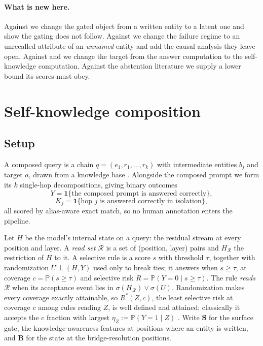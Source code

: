 \documentclass{article}
\newcommand{\gate}{\mathbf{S}}
\newcommand{\bridge}{\mathbf{B}}
\begin{document}
\paragraph{What is new here.} Against \citet{ferrando2025entity} we change the gated object from a
written entity to a latent one and show the gating does not follow. Against
\citet{tamoyan2025factual} we change the failure regime to an unrecalled attribute of an
\emph{unnamed} entity and add the causal analysis they leave open. Against \citet{yang2024latent}
and \citet{biran2024hopping} we change the target from the answer computation to the self-knowledge
computation. Against the abstention literature we supply a lower bound its scores must obey.

\section{Self-knowledge composition}
\label{sec:theory}

\subsection{Setup}

A composed query is a chain $q=(e_1,r_1,\dots,r_k)$ with intermediate entities $b_j$ and target $a$,
drawn from a knowledge base \citep{vrandecic2014wikidata}. Alongside the composed prompt we form its
$k$ single-hop decompositions, giving binary outcomes
\[
Y=\mathbf{1}\{\text{the composed prompt is answered correctly}\},
\]
\[
K_j=\mathbf{1}\{\text{hop }j\text{ is answered correctly in isolation}\},
\]
all scored by alias-aware exact match, so no human annotation enters the pipeline.

Let $H$ be the model's internal state on a query: the residual stream at every position and layer. A
\emph{read set} $\mathcal{R}$ is a set of (position, layer) pairs and $H_{\mathcal{R}}$ the
restriction of $H$ to it. A selective rule is a score $s$ with threshold $\tau$, together with randomization
$U\perp(H,Y)$ used only to break ties; it answers when $s\ge\tau$, at coverage
$c=\mathbb{P}(s\ge\tau)$ and selective risk $R=\mathbb{P}(Y=0\mid s\ge\tau)$. The rule \emph{reads}
$\mathcal{R}$ when its acceptance event lies in $\sigma(H_{\mathcal{R}})\vee\sigma(U)$. Randomization
makes every coverage exactly attainable, so $R^\ast(Z,c)$, the least selective risk at coverage $c$
among rules reading $Z$, is well defined and attained; classically it accepts the $c$ fraction with largest $\eta_Z:=\mathbb{P}(Y=1\mid Z)$
\citep{chow1970optimum,elyaniv2010foundations}. Write $\gate$ for the surface gate, the
knowledge-awareness features at positions where an entity is written, and $\bridge$ for the state at
the bridge-resolution positions.
\end{document}
